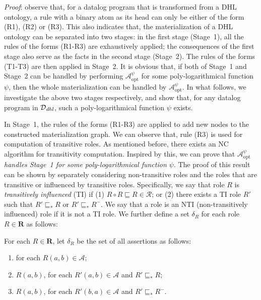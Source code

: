 \noindent\emph{Proof}: observe that, for a datalog program that is transformed from a DHL ontology,
a rule with a binary atom as its head can only be either of the form (R1), (R2) or (R3).
This also indicates that, the materialization of a DHL
ontology can be separated into two stages: in the first stage (Stage~1), all the rules
of the forms (R1-R3) are exhaustively applied; the consequences of the first stage
also serve as the facts in the second stage (Stage~2). The rules of the forms (T1-T3)
are then applied in Stage~2.
It is obvious that, if both of Stage~1 and Stage~2 can be handled
by performing $\mathcal{A}_{\text{opt}}^\psi$ for some poly-logarithmical function $\psi$, then
the whole materialization can be handled by $\mathcal{A}_{\text{opt}}^\psi$.
In what follows, we investigate the above two stages respectively, and show that,
for any datalog program in $\mathcal{D}_{\textit{\text{dhl}}}$,
such a poly-logarithmical function $\psi$ exists.

In Stage~1, the rules of the forms (R1-R3)
are applied to add new nodes to the constructed materialization graph.
We can observe that, rule (R3) is used for computation of transitive roles.
As mentioned before, there exists an NC algorithm for transitivity computation.
Inspired by this, we can prove that \emph{$\mathcal{A}_{\text{opt}}^\psi$
handles Stage~1 for some poly-logarithmical function $\psi$}.
The proof of this result can be shown by separately considering non-transitive roles and
the roles that are transitive or influenced by transitive roles.
Specifically, we say that role $R$ is \emph{transitively influenced} (TI)
if (1) $R\circ R\sqsubseteq R\in\mathcal{R}$; or
(2) there exists a TI role $R'$ such that $R'\sqsubseteq_*R$ or $R'\sqsubseteq_*R^-$.
We say that a role is an NTI (non-transitively influenced) role if it is not a TI role.
We further define a set $\delta_R$ for each role $R\in\textbf{R}$ as follows:

\begin{definition}\label{def:deltaRdhl}
For each $R\in\textbf{R}$, let $\delta_R$ be the set of all assertions as follows:
\begin{enumerate}[leftmargin=4ex,label=\arabic*.]
\item for each $R(a,b)\in\mathcal{A}$;
\item $R(a,b)$, for each $R'(a,b)\in\mathcal{A}$ and $R'\sqsubseteq_{*}R$;
\item $R(a,b)$, for each $R'(b,a)\in\mathcal{A}$ and $R'\sqsubseteq_{*}R^-$.
\end{enumerate}
\end{definition}

